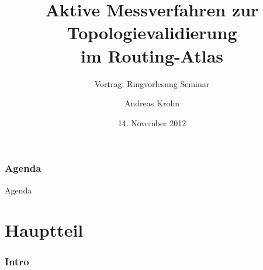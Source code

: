 \documentclass[ngerman,compress,hyperref={bookmarks}]{beamer}
\title{Aktive Messverfahren zur Topologievalidierung\\ im Routing-Atlas}
\subtitle{Vortrag: Ringvorlesung Seminar}
\author{Andreas Krohn}
\institute[HAW]{Hochschule für Angewandte Wissenschaften Hamburg}
\date[WS 2012/13]{14. November 2012}
\begin{document}
\frame[plain]{\titlepage}

\section*{Agenda}
\begin{frame}{Agenda} \setcounter{tocdepth}{1} \tableofcontents[part=1] \setcounter{tocdepth}{3} \end{frame}

\part{Hauptteil}
\section{Intro}
\end{document}
